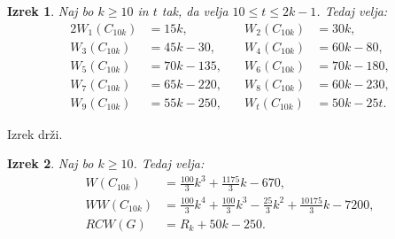 \documentclass[a4paper, 12pt]{article}
\newtheorem{izrek}{Izrek}[section]
\begin{document}
\begin{izrek}
    Naj bo $k \geq 10$ in $t$ tak, da velja $10 \leq t \leq 2k - 1$. Tedaj velja:
    \begin{alignat*}{2}
        W_1(C_{10k}) &= 15k,  &\quad W_2(C_{10k}) &= 30k, \\
        W_3(C_{10k}) &= 45k - 30, &\quad W_4(C_{10k}) &= 60k - 80, \\
        W_5(C_{10k}) &= 70k - 135, &\quad W_6(C_{10k}) &= 70k - 180, \\
        W_7(C_{10k}) &= 65k - 220, &\quad W_8(C_{10k}) &= 60k - 230, \\
        W_9(C_{10k}) &= 55k - 250, &\quad W_t(C_{10k}) &= 50k - 25t.
    \end{alignat*}
\end{izrek}

Izrek drži.

\begin{izrek}
    Naj bo $k \geq 10$. Tedaj velja:
    \begin{align*}
        W(C_{10k}) &= \frac{100}{3} k^3 + \frac{1175}{3} k - 670, \\
        WW(C_{10k}) &= \frac{100}{3} k^4 + \frac{100}{3} k^3 - \frac{25}{3} k^2 + \frac{10175}{3} k - 7200, \\
        RCW(G) &= R_k + 50k - 250.
    \end{align*}
\end{izrek}
\end{document}

